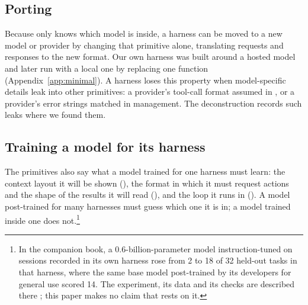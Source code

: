 \subsection{Porting}
Because only  knows which model is inside, a harness can be moved to a new model or provider by changing that primitive alone, translating requests and responses to the new format. Our own harness was built around a hosted model and later run with a local one by replacing one function (Appendix~\ref{app:minimal}). A harness loses this property when model-specific details leak into other primitives: a provider's tool-call format assumed in , or a provider's error strings matched in  management. The deconstruction records such leaks where we found them.

\subsection{Training a model for its harness}
The primitives also say what a model trained for one harness must learn: the context layout it will be shown (), the format in which it must request actions and the shape of the results it will read (), and the loop it runs in (). A model post-trained for many harnesses must guess which one it is in; a model trained inside one does not.\footnote{In the companion book, a 0.6-billion-parameter model instruction-tuned on sessions recorded in its own harness rose from 2 to 18 of 32 held-out tasks in that harness, where the same base model post-trained by its developers for general use scored 14. The experiment, its data and its checks are described there \citep{course}; this paper makes no claim that rests on it.}
